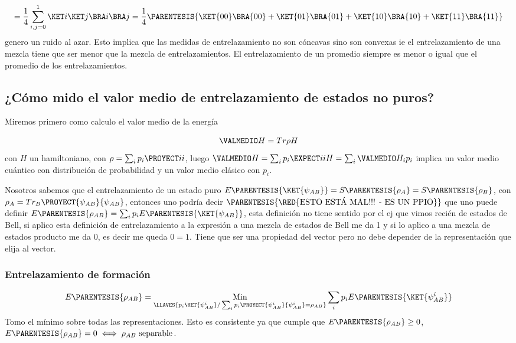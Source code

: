 \[
=\frac{1}{4}\sum_{i,j=0}^{1}\KET i\KET j\BRA i\BRA j=\frac{1}{4}\PARENTESIS{\KET{00}\BRA{00}+\KET{01}\BRA{01}+\KET{10}\BRA{10}+\KET{11}\BRA{11}}
\]
genero un ruido al azar. Esto implica que las medidas de entrelazamiento
no son cóncavas sino son convexas ie el entrelazamiento de una mezcla
tiene que ser menor que la mezcla de entrelazamientos. El entrelazamiento
de un promedio siempre es menor o igual que el promedio de los entrelazamientos. 

\subsection{¿Cómo mido el valor medio de entrelazamiento de estados no puros?}

Miremos primero como calculo el valor medio de la energía

\[
\VALMEDIO H=Tr\rho H
\]
con $H$ un hamiltoniano, con $\rho=\sum_{i}p_{i}\PROYECT ii$, luego
$\VALMEDIO H=\sum_{i}p_{i}\EXPECT iiH=\sum_{i}\VALMEDIO H_{i}p_{i}$
implica un valor medio cuántico con distribución de probabilidad y
un valor medio clásico con $p_{i}$.

Nosotros sabemos que el entrelazamiento de un estado puro $E\PARENTESIS{\KET{\psi_{AB}}}=S\PARENTESIS{\rho_{A}}=S\PARENTESIS{\rho_{B}}$,
con $\rho_{A}=Tr_{B}\PROYECT{\psi_{AB}}{\psi_{AB}}$, entonces uno
podría decir $\PARENTESIS{\RED{\text{ESTO ESTÁ MAL!!! - ES UN PPIO}}}$
que uno puede definir $E\PARENTESIS{\rho_{AB}}=\sum_{i}p_{i}E\PARENTESIS{\KET{\psi_{AB}}}$,
esta definición no tiene sentido por el ej que vimos recién de estados
de Bell, si aplico esta definición de entrelazamiento a la expresión
a una mezcla de estados de Bell me da 1 y si lo aplico a una mezcla
de estados producto me da 0, es decir me queda $0=1$. Tiene que ser
una propiedad del vector pero no debe depender de la representación
que elija al vector. 

\subsubsection{Entrelazamiento de formación}

\[
E\PARENTESIS{\rho_{AB}}=\underset{\LLAVES{p_{i}\KET{\psi_{AB}^{i}}/\sum_{i}p_{i}\PROYECT{\psi_{AB}^{i}}{\psi_{AB}^{i}}=\rho_{AB}}}{\text{Min}}\sum_{i}p_{i}E\PARENTESIS{\KET{\psi_{AB}^{i}}}
\]
 Tomo el mínimo sobre todas las representaciones. Esto es consistente
ya que cumple que $E\PARENTESIS{\rho_{AB}}\ge0$, $E\PARENTESIS{\rho_{AB}}=0\iff\rho_{AB}\text{ separable}$. 

